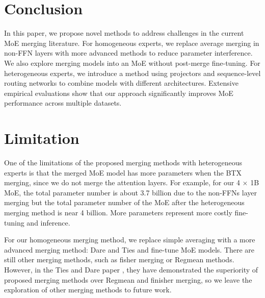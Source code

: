 \section{Conclusion}


In this paper, we propose novel methods to address challenges in the current MoE merging literature. For homogeneous experts, we replace average merging in non-FFN layers with more advanced methods to reduce parameter interference. We also explore merging models into an MoE without post-merge fine-tuning. For heterogeneous experts, we introduce a method using projectors and sequence-level routing networks to combine models with different architectures. Extensive empirical evaluations show that our approach significantly improves MoE performance across multiple datasets.

\section{Limitation}

One of the limitations of the proposed merging methods with heterogeneous experts is that the merged MoE model has more parameters when the BTX merging, since we do not merge the attention layers. For example, for our 4 $\times$ 1B \llama MoE, the total parameter number is about 3.7 billion due to the non-FFNs layer merging but the total parameter number of the MoE after the heterogeneous merging method is near 4 billion. More parameters represent more costly fine-tuning and inference.

For our homogeneous merging method, we replace simple averaging with a more advanced merging method: Dare and Ties and fine-tune MoE models. There are still other merging methods, such as fisher merging \cite{matena2022merging} or Regmean \cite{jin2022dataless} methods. However, in the Ties and Dare paper \cite{yadav2024ties, yu2024language}, they have demonstrated the superiority of proposed merging methods over Regmean and finisher merging, so we leave the exploration of other merging methods to future work.

